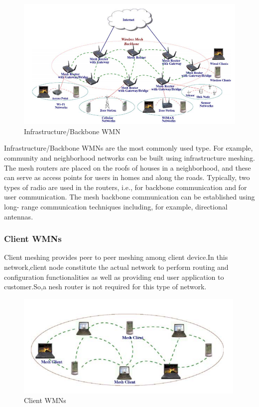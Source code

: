 \documentclass[12pt,a4paper]{report}
\begin{document}
\begin{figure}[hbtp]
\centering
\includegraphics[scale=0.75]{infrastructure-mesh-clear.png}
\caption{Infrastructure/Backbone WMN}
\end{figure}

Infrastructure/Backbone WMNs are the most commonly used type. For example,
community and neighborhood networks can be built using infrastructure meshing.
The mesh routers are placed on the roofs of houses in a neighborhood, and these
can serve as access points for users in homes and along the roads. Typically, two
types of radio are used in the routers, i.e., for backbone communication and for user
communication. The mesh backbone communication can be established using long-
range communication techniques including, for example, directional antennas.

\subsubsection{Client WMNs}
Client meshing provides peer to peer meshing among client device.In this network,client node constitute the actual network to perform routing and configuration functionalities as well as providing end user application to customer.So,a nesh router is not required for this type of network.

\begin{figure}[hbtp]
\centering
\includegraphics[scale=.5]{client-wmn.png}
\caption{Client WMNs}
\end{figure}
\end{document}
